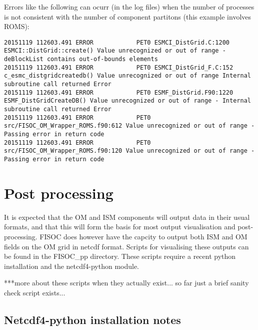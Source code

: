 \documentclass[12pt]{article}
\begin{document}
Errors like the following can ocurr (in the log files) when the number of processes is 
not consistent with the number of component partitons (this example involves ROMS):
\begin{lstlisting}
20151119 112603.491 ERROR            PET0 ESMCI_DistGrid.C:1200 ESMCI::DistGrid::create() Value unrecognized or out of range - deBlockList contains out-of-bounds elements
20151119 112603.491 ERROR            PET0 ESMCI_DistGrid_F.C:152 c_esmc_distgridcreatedb() Value unrecognized or out of range Internal subroutine call returned Error
20151119 112603.491 ERROR            PET0 ESMF_DistGrid.F90:1220 ESMF_DistGridCreateDB() Value unrecognized or out of range - Internal subroutine call returned Error
20151119 112603.491 ERROR            PET0 src/FISOC_OM_Wrapper_ROMS.f90:612 Value unrecognized or out of range - Passing error in return code
20151119 112603.491 ERROR            PET0 src/FISOC_OM_Wrapper_ROMS.f90:120 Value unrecognized or out of range - Passing error in return code
\end{lstlisting}





\section{Post processing}

It is expected that the OM and ISM components will output data in their usual formats, 
and that this will form the basis for most output visualisation and post-processing.
FISOC does however have the capcity to output both ISM and OM fields on the OM grid 
in netcdf format.
Scripts for visualising these outputs can be found in the FISOC\_pp directory.
These scripts require a recent python installation and the netcdf4-python module.

***more about these scripts when they actually exist... so far just a brief sanity 
check script exists...




\subsection{Netcdf4-python installation notes}
\end{document}
